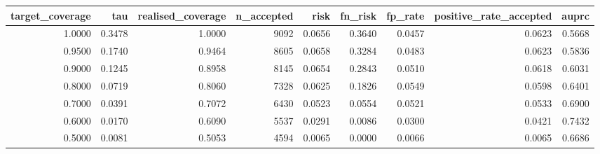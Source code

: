 \begin{tabular}{rrrrrrrrr}
\toprule
target\_coverage & tau & realised\_coverage & n\_accepted & risk & fn\_risk & fp\_rate & positive\_rate\_accepted & auprc \\
\midrule
1.0000 & 0.3478 & 1.0000 & 9092 & 0.0656 & 0.3640 & 0.0457 & 0.0623 & 0.5668 \\
0.9500 & 0.1740 & 0.9464 & 8605 & 0.0658 & 0.3284 & 0.0483 & 0.0623 & 0.5836 \\
0.9000 & 0.1245 & 0.8958 & 8145 & 0.0654 & 0.2843 & 0.0510 & 0.0618 & 0.6031 \\
0.8000 & 0.0719 & 0.8060 & 7328 & 0.0625 & 0.1826 & 0.0549 & 0.0598 & 0.6401 \\
0.7000 & 0.0391 & 0.7072 & 6430 & 0.0523 & 0.0554 & 0.0521 & 0.0533 & 0.6900 \\
0.6000 & 0.0170 & 0.6090 & 5537 & 0.0291 & 0.0086 & 0.0300 & 0.0421 & 0.7432 \\
0.5000 & 0.0081 & 0.5053 & 4594 & 0.0065 & 0.0000 & 0.0066 & 0.0065 & 0.6686 \\
\bottomrule
\end{tabular}

